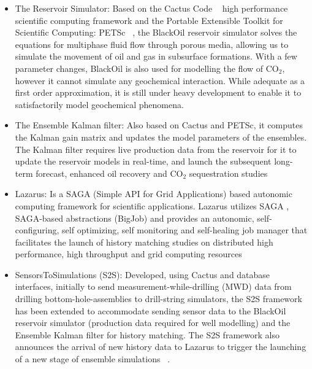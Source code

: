 \documentclass[10pt,conference,final]{IEEEtran}
\begin{document}
\begin{itemize}
\item The Reservoir Simulator: Based on the Cactus Code ~\cite{cactus_web} high 
performance scientific computing framework and the Portable Extensible Toolkit for 
Scientific Computing: PETSc ~\cite{PETSc}, the BlackOil reservoir simulator solves the 
equations for multiphase fluid flow through porous media, allowing us to simulate the 
movement of oil and gas in subsurface formations. With a few parameter changes, BlackOil 
is also used for modelling the flow of CO$_2$, however it cannot 
simulate any geochemical interaction. While adequate as a first order approximation, it is 
still under heavy development to enable it to satisfactorily model geochemical phenomena.

\item The Ensemble Kalman filter: Also based on Cactus and PETSc, it computes the Kalman 
gain matrix and updates the model parameters of the ensembles. The Kalman filter requires 
live production data from the reservoir for it to update the reservoir models in 
real-time, and launch the subsequent long-term forecast, enhanced oil recovery and CO$_2$ 
sequestration studies

\item Lazarus: Is a SAGA (Simple API for Grid Applications) based autonomic computing 
framework for scientific applications. Lazarus utilizes SAGA , SAGA-based 
abstractions (BigJob) and provides an autonomic, self-configuring, self optimizing, self 
monitoring and self-healing job manager that facilitates the launch of history matching 
studies on distributed high performance, high throughput and grid computing resources 
~\cite{gmac}

\item SensorsToSimulations (S2S): Developed, using Cactus and database interfaces, 
initially to send measurement-while-drilling (MWD) data from drilling 
bottom-hole-assemblies to drill-string simulators, the S2S framework has been extended to 
accommodate sending sensor data to the BlackOil reservoir simulator (production data 
required for well modelling) and the Ensemble Kalman filter for history matching. The S2S 
framework also announces the arrival of new history data to Lazarus to trigger the 
launching of a new stage of ensemble simulations ~\cite{Duff2,Duff1}.

\end{itemize}
\end{document}
